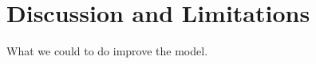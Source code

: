 \section{Discussion and Limitations}
\label{sec:discussion}


What we could to do improve the model.

